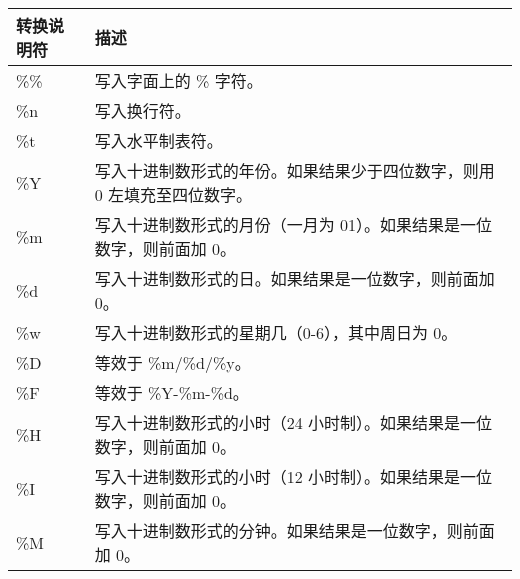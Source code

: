 \begin{longtable}{|l|l|}
\hline
\textbf{转换说明符} & \textbf{描述}                                                                                         \\ \hline
\endfirsthead
%
\endhead
%
\%\%                          & 写入字面上的 \% 字符。                                                                                 \\ \hline
\%n                           & 写入换行符。                                                                                          \\ \hline
\%t                           & 写入水平制表符。                                                                                      \\ \hline
\%Y & 写入十进制数形式的年份。如果结果少于四位数字，则用 0 左填充至四位数字。                             \\ \hline
\%m & 写入十进制数形式的月份（一月为 01）。如果结果是一位数字，则前面加 0。                                  \\ \hline
\%d & 写入十进制数形式的日。如果结果是一位数字，则前面加 0。                                              \\ \hline
\%w                           & 写入十进制数形式的星期几（0-6），其中周日为 0。                                                        \\ \hline
\%D                           & 等效于 \%m/\%d/\%y。                                                                                  \\ \hline
\%F                           & 等效于 \%Y-\%m-\%d。                                                                                  \\ \hline
\%H                           & 写入十进制数形式的小时（24 小时制）。如果结果是一位数字，则前面加 0。                                 \\ \hline
\%I                           & 写入十进制数形式的小时（12 小时制）。如果结果是一位数字，则前面加 0。                                 \\ \hline
\%M                           & 写入十进制数形式的分钟。如果结果是一位数字，则前面加 0。                                                \\ \hline

\end{longtable}
